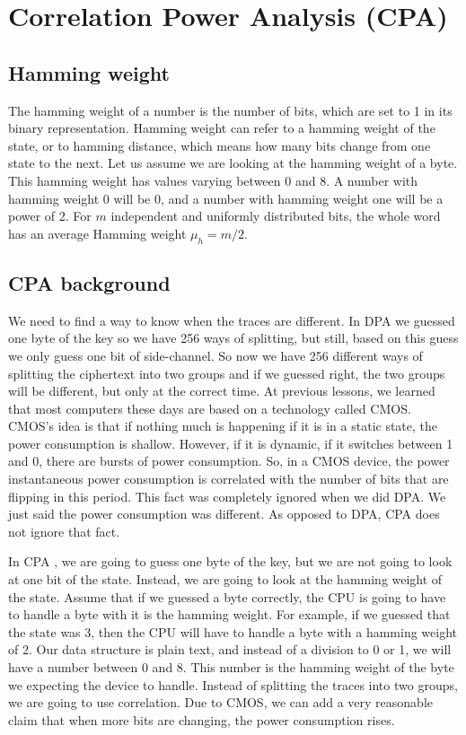 \section{Correlation Power Analysis (CPA)}\label{c8_cpa:sec}

\subsection{Hamming weight}\label{c8_CPA_hamming_weight:subsec}

The hamming weight \cite{hamming} of a number is the number of bits, which are set to 1 in its binary
representation. Hamming weight can refer to a hamming weight of the state, or to
hamming distance, which means how many bits change from one state to the
next. Let us assume we are looking at the hamming weight of a byte. This hamming
weight has values varying between 0 and 8. A number with hamming weight 0 will be 0, and
a number with hamming weight one will be a power of 2. For $m$ independent and uniformly
distributed bits, the whole word has an average Hamming weight $\mu_h = m/2$.

\subsection{CPA background}\label{c8_CPA_background:subsec}

We need to find a way to know when the traces are different. In DPA \cite{kocher1999differential, kocher1998introduction} we guessed
one byte of the key so we have 256 ways of splitting, but still, based on this
guess we only guess one bit of side-channel. So now we have 256 different ways
of splitting the ciphertext into two groups and if we guessed right, the two
groups will be different, but only at the correct time.
At previous lessons, we learned that most computers these days are based on
a technology called CMOS. CMOS's idea is that if nothing much is happening
if it is in a static state,  the power consumption is shallow. However, if it is
dynamic, if it switches between 1 and 0, there are bursts of power consumption.
So, in a CMOS device, the power instantaneous power consumption is correlated
with the number of bits that are flipping in this period. This fact was
completely ignored when we did DPA. We just said the power consumption was
different. As opposed to DPA, CPA does not ignore that fact. 

In CPA \cite{brier2004correlation, coron1962statistics, mayer2000smartly, oswald2003side},
we are going to guess one byte of the key, but we are not going to look
at one bit of the state. Instead, we are going to look at the hamming weight of the
state. Assume that if we guessed a byte correctly, the CPU is going to have to
handle a byte with it is the hamming weight. For example, if we guessed that the
state was 3, then the CPU will have to handle a byte with a hamming weight of 2.
Our data structure is plain text, and instead of a division to 0 or 1, we will
have a number between 0 and 8. This number is the hamming weight of the byte we
expecting the device to handle. Instead of splitting the traces into two groups,
we are going to use correlation. Due to CMOS, we can add a very reasonable claim
that when more bits are changing, the power consumption rises.

